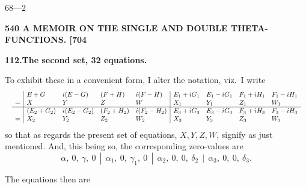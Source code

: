 \documentclass[11pt]{article}
\begin{document}
\hfill $68$---$2$

\newpage
\noindent\textbf{540 \hfill A MEMOIR ON THE SINGLE AND DOUBLE THETA-FUNCTIONS. \hfill [704}

\medskip
\begin{center}\textbf{112.\quad The second set, 32 equations.}\end{center}

To exhibit these in a convenient form, I alter the notation, viz.\ I write
\[
\resizebox{\textwidth}{!}{$\displaystyle
\begin{array}{l|llll|llll}
& E+G & i(E-G) & (F+H) & i(F-H) & E_1+iG_1 & E_1-iG_1 & F_1+iH_1 & F_1-iH_1\\
= & X & Y & Z & W & X_1 & Y_1 & Z_1 & W_1\\\hline
& (E_2+G_2) & i(E_2-G_2) & (F_2+H_2) & i(F_2-H_2) & E_3+iG_3 & E_3-iG_3 & F_3+iH_3 & F_3-iH_3\\
= & X_2 & Y_2 & Z_2 & W_2 & X_3 & Y_3 & Z_3 & W_3\\
\end{array}
$}
\]
so that as regards the present set of equations, $X, Y, Z, W$, signify as just mentioned. And, this being so, the corresponding zero-values are
\[
\alpha,\ 0,\ \gamma,\ 0\ \ |\ \ \alpha_1,\ 0,\ \gamma_1,\ 0\ \ |\ \ \alpha_2,\ 0,\ 0,\ \delta_2\ \ |\ \ \alpha_3,\ 0,\ 0,\ \delta_3.
\]

The equations then are
\end{document}
